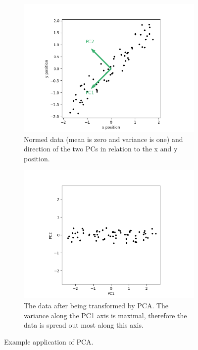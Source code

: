 \documentclass[a4paper]{IEEEtran}
\begin{document}
\begin{figure}
	\centering
	\begin{subfigure}{0.5\textwidth}
		\includegraphics[width=\textwidth]{figs/some_nice_data_pc}
		\caption{Normed data (mean is zero and variance is one) and direction of the two PCs in relation to the x and y position.}
		\label{fig:some_nice_data_pc}
	\end{subfigure}
	\hfill
	\begin{subfigure}{0.5\textwidth}
		\includegraphics[width=\textwidth]{figs/some_nice_data_pca}
		\caption{The data after being transformed by PCA. The variance along the PC1 axis is maximal, therefore the data is spread out most along this axis.}
		\label{fig:some_nice_data_pca}
	\end{subfigure}
	
	\caption{Example application of PCA.}
	\label{fig:pca_example}
\end{figure}
\end{document}
